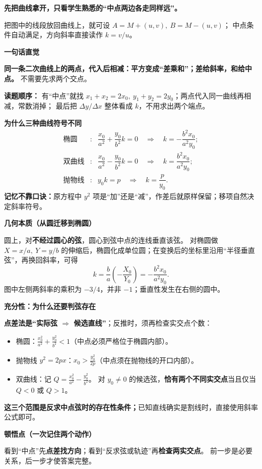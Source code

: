\clearpage
\begin{explanationbox}
\textbf{先把曲线拿开，只看学生熟悉的“中点两边各走同样远”。}
\begin{center}\end{center}
把图中的线段放回曲线上，就可设 $A=M+(u,v),\ B=M-(u,v)$；
中点条件自动满足，方向斜率直接读作 $k=v/u$。

\textbf{\textcolor{CExplanation}{一句话直觉}}

\textbf{同一条二次曲线上的两点，代入后相减：平方变成“差乘和”；差给斜率，和给中点。}
不需要先求两个交点。

\medskip
\textbf{\textcolor{CExplanation}{读题顺序：}}
有“中点”就找 $x_1+x_2=2x_0,\ y_1+y_2=2y_0$；两点代入同一曲线再相减，常数消掉；
最后把 $\Delta y/\Delta x$ 整体看成 $k$，不用求出两个端点。

\medskip
\textbf{\textcolor{CExplanation}{为什么三种曲线符号不同}}
\[
\begin{array}{ccl}
\text{椭圆}&:& \dfrac{x_0}{a^2}+\dfrac{y_0}{b^2}k=0
\quad\Longrightarrow\quad k=-\dfrac{b^2x_0}{a^2y_0};\\[6pt]
\text{双曲线}&:& \dfrac{x_0}{a^2}-\dfrac{y_0}{b^2}k=0
\quad\Longrightarrow\quad k=\dfrac{b^2x_0}{a^2y_0};\\[6pt]
\text{抛物线}&:& y_0k=p
\quad\Longrightarrow\quad k=\dfrac{p}{y_0}.
\end{array}
\]
\textbf{记忆不靠口诀：}原方程中 $y^2$ 项是“加”还是“减”，作差后就原样保留；移项自然决定斜率符号。

\medskip
\tcbbreak
\textbf{\textcolor{CExplanation}{几何本质（从圆迁移到椭圆）}}
\begin{center}\end{center}

圆上，对\textbf{不经过圆心的弦}，圆心到弦中点的连线垂直该弦。
对椭圆做 $X=x/a,\ Y=y/b$ 的伸缩后，椭圆化成单位圆；在变换后的坐标里沿用“半径垂直弦”，再换回斜率，可得
\[
k=\frac ba\left(-\frac{X_0}{Y_0}\right)
=-\frac{b^2x_0}{a^2y_0}.
\]
图中左侧两斜率的乘积为 $-3/4$，并非 $-1$；垂直性发生在右侧的圆中。

\medskip
\textbf{\textcolor{CExplanation}{充分性：为什么还要判弦存在}}

\textbf{点差法是“实际弦 $\Rightarrow$ 候选直线”}；反推时，须再检查实交点个数：
\begin{itemize}[leftmargin=*,itemsep=0.4em,topsep=0.3em]
  \item 椭圆：$\displaystyle \frac{x_0^2}{a^2}+\frac{y_0^2}{b^2}<1$（中点必须严格位于椭圆内部）。
  \item 抛物线 $y^2=2px$：$\displaystyle x_0>\frac{y_0^2}{2p}$（中点须在抛物线的开口内部）。
  \item 双曲线：记 $\displaystyle Q=\frac{x_0^2}{a^2}-\frac{y_0^2}{b^2}$。
  对 $y_0\ne0$ 的候选弦，\textbf{恰有两个不同实交点}当且仅当 $Q<0$ 或 $Q>1$。
\end{itemize}
\textbf{这三个范围是反求中点弦时的存在性条件；}已知直线确实是割线时，直接使用斜率公式即可。

\medskip
\textbf{\textcolor{CExplanation}{顿悟点（一次记住两个动作）}}

看到“中点”先\textbf{点差找方向}；看到“反求弦或轨迹”再\textbf{检查两实交点}。
前一步是必要关系，后一步才使答案完整。
\end{explanationbox}
